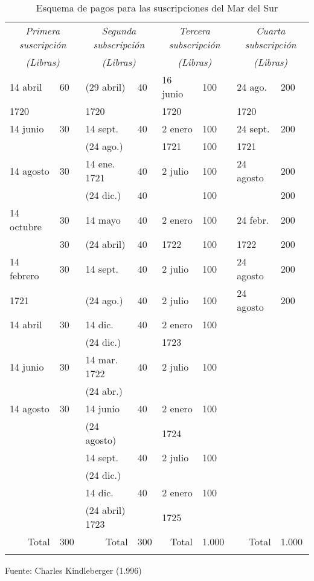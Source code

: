 \begin{table}
\begin{tabular}{llllllll}
\hline
\multicolumn{2}{c}{\emph{Primera suscripción}} & \multicolumn{2}{c}{\emph{Segunda subscripción}} & \multicolumn{2}{c}{\emph{Tercera subscripción}} & \multicolumn{2}{c}{\emph{Cuarta subscripción}}
\tabularnewline
\multicolumn{2}{c}{\emph{(Libras)}} & \multicolumn{2}{c}{\emph{(Libras)}} & \multicolumn{2}{c}{\emph{(Libras)}} & \multicolumn{2}{c}{\emph{(Libras)}}\tabularnewline
\hline 

 14 abril   & 60 & (29 abril) & 40              & 16 junio & 100 & 24 ago. & 200 \tabularnewline
 1720 &     & 1720            &                 & 1720 &   & 1720 &   \tabularnewline
 14 junio   & 30              & 14 sept.        & 40 & 2 enero & 100 & 24 sept. & 200 \tabularnewline
            &                 & (24 ago.)       &   & 1721 & 100 & 1721 &   \tabularnewline
 14 agosto  & 30              & 14 ene. 1721    & 40 & 2 julio & 100 & 24 agosto & 200 \tabularnewline
            &                 & (24 dic.)       & 40 &   & 100 &   & 200 \tabularnewline
 14 octubre & 30              & 14 mayo         & 40 & 2 enero & 100 & 24 febr. & 200 \tabularnewline
            & 30              & (24 abril)      & 40 & 1722 & 100 & 1722 & 200 \tabularnewline
 14 febrero & 30              & 14 sept.        & 40 & 2 julio & 100 & 24 agosto & 200 \tabularnewline
 1721       &                 & (24 ago.)       & 40 & 2 julio & 100 & 24 agosto & 200 \tabularnewline
 14 abril   & 30              & 14 dic.         & 40 & 2 enero & 100 &   &   \tabularnewline
   &        & (24 dic.)       &                 & 1723  &   &   &   \tabularnewline
 14 junio   & 30              & 14 mar. 1722    & 40 & 2 julio & 100 &   &   \tabularnewline
            &                 & (24 abr.)       &   &   &   &   &   \tabularnewline
 14 agosto  & 30              & 14 junio        & 40 & 2 enero & 100 &   &   \tabularnewline
            &                 & (24 agosto)     &   & 1724 &   &   &   \tabularnewline
            &                 & 14 sept.        & 40 & 2 julio & 100 &   &   \tabularnewline
            &                 & (24 dic.)       &   &   &   &   &   \tabularnewline
            &                 & 14 dic.         & 40 & 2 enero & 100 &   &   \tabularnewline
            &                 & (24 abril) 1723 &   & 1725 &   &   &   \tabularnewline 
 \hline
\multicolumn{1}{r}{Total} & 300 & \multicolumn{1}{r}{Total} & 300 & \multicolumn{1}{r}{Total} & 1.000 & \multicolumn{1}{r}{Total} & 1.000 \tabularnewline 
\hline 
\tabularnewline
\end{tabular}

	\center
	\footnotesize
	Fuente: Charles Kindleberger (1.996)
	
\caption{Esquema de pagos para las suscripciones del Mar del Sur}
\label{tab:pagosSuscripciones}
	
\end{table}
